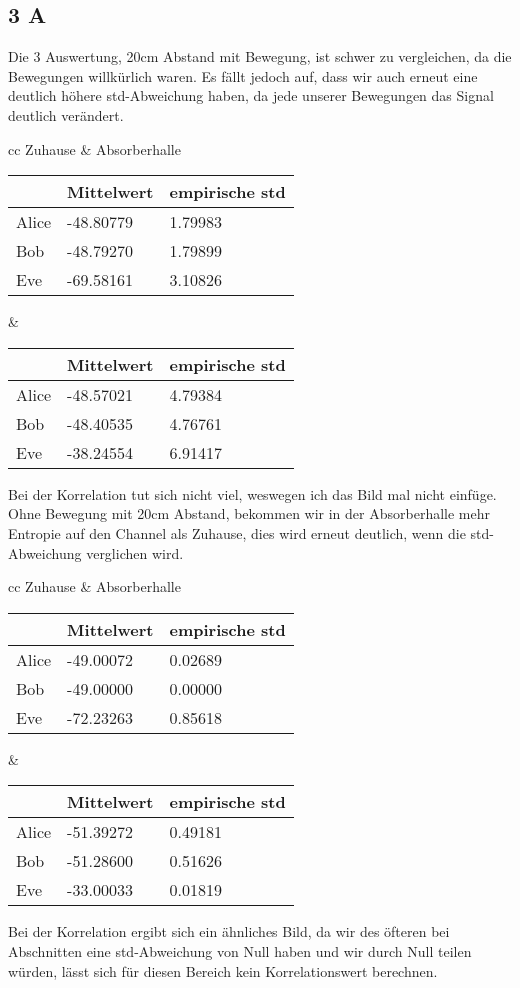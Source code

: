 \documentclass[12pt,a4paper]{article}
\begin{document}
\subsection*{3 A}
Die 3 Auswertung, 20cm Abstand mit Bewegung, ist schwer zu vergleichen, da die Bewegungen willkürlich waren. Es fällt jedoch auf, dass wir auch erneut eine deutlich höhere std-Abweichung haben, da jede unserer Bewegungen das Signal deutlich verändert.
\begin{table}[H]
\centering
\begin{tabular}{ cc }
Zuhause & Absorberhalle  \\
\begin{tabular}{l|l|l}
& Mittelwert & empirische std \\
\hline
Alice & -48.80779 & 1.79983 \\
\hline
Bob & -48.79270 & 1.79899 \\
\hline
Eve & -69.58161 & 3.10826 \\
\end{tabular} &
\begin{tabular}{l|l|l}
& Mittelwert & empirische std \\
\hline
Alice & -48.57021 & 4.79384 \\
\hline
Bob & -48.40535 & 4.76761 \\
\hline
Eve & -38.24554 & 6.91417 \\
\end{tabular}
\end{tabular}
\end{table}
Bei der Korrelation tut sich nicht viel, weswegen ich das Bild mal nicht einfüge.\\
Ohne Bewegung mit 20cm Abstand, bekommen wir in der Absorberhalle mehr Entropie auf den Channel als Zuhause, dies wird erneut deutlich, wenn die std-Abweichung verglichen wird.
\begin{table}[H]
\centering
\begin{tabular}{ cc }
Zuhause & Absorberhalle  \\
\begin{tabular}{l|l|l}
& Mittelwert & empirische std \\
\hline
Alice & -49.00072 & 0.02689 \\
\hline
Bob & -49.00000 & 0.00000 \\
\hline
Eve & -72.23263 & 0.85618 \\
\end{tabular} &
\begin{tabular}{l|l|l}
& Mittelwert & empirische std \\
\hline
Alice & -51.39272 & 0.49181 \\
\hline
Bob & -51.28600 & 0.51626 \\
\hline
Eve & -33.00033 & 0.01819 \\
\end{tabular}
\end{tabular}
\end{table}
Bei der Korrelation ergibt sich ein ähnliches Bild, da wir des öfteren bei Abschnitten eine std-Abweichung von Null haben und wir durch Null teilen würden, lässt sich für diesen Bereich kein Korrelationswert berechnen.\\
\end{document}
